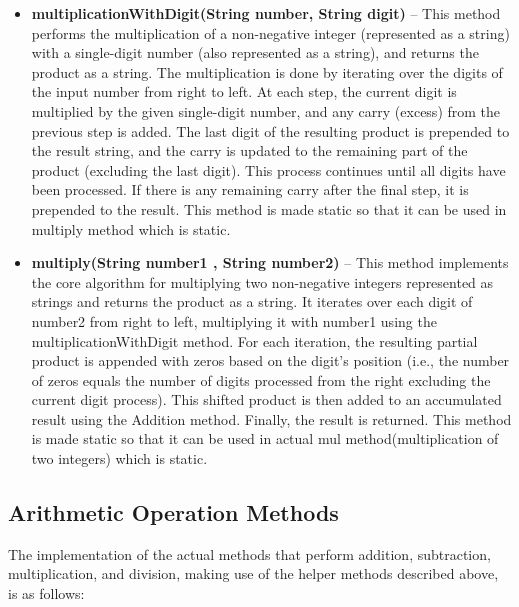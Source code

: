 \documentclass[a4paper,12pt]{article}
\begin{document}
{\begin{itemize}
    \item \textbf{multiplicationWithDigit(String number, String digit)} -- This method performs the multiplication of a non-negative integer (represented as a string) with a single-digit number (also represented as a string), and returns the product as a string. The multiplication is done by iterating over the digits of the input number from right to left. At each step, the current digit is multiplied by the given single-digit number, and any carry (excess) from the previous step is added. The last digit of the resulting product is prepended to the result string, and the carry is updated to the remaining part of the product (excluding the last digit). This process continues until all digits have been processed. If there is any remaining carry after the final step, it is prepended to the result. This method is made static so that it can be used in multiply method which is static.\\
    \item \textbf{multiply(String number1 , String number2)} -- This method implements the core algorithm for multiplying two non-negative integers represented as strings and returns the product as a string. It iterates over each digit of number2 from right to left, multiplying it with number1 using the multiplicationWithDigit method. For each iteration, the resulting partial product is appended with zeros based on the digit’s position (i.e., the number of zeros equals the number of digits processed from the right excluding the current digit process). This shifted product is then added to an accumulated result using the Addition method. Finally, the result is returned. This method is made static so that it can be used in actual mul method(multiplication of two integers) which is static.\\
\end{itemize}

\subsection{Arithmetic Operation Methods}
The implementation of the actual methods that perform addition, subtraction, multiplication, and division, making use of the helper methods described above, is as follows:\\

}
\end{document}
